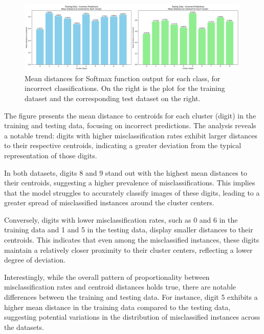 \begin{figure}[h]
    \centering
    \includegraphics[width=0.99\textwidth]{Figures/Methods/MNIST_Incorrect_Training_and_Testing_Mean_Distance_To_Centroids.png}
    \caption{Mean distances for Softmax function output for each class, for incorrect classifications. On the right is the plot for the training dataset and the corresponding test dataset on the right.}
    \label{fig:MNIST_Incorrect_Training_and_Testing_Mean_Distance_To_Centroids}
\end{figure}


The figure presents the mean distance to centroids for each cluster (digit) in the training and testing data, focusing on incorrect predictions. The analysis reveals a notable trend: digits with higher misclassification rates exhibit larger distances to their respective centroids, indicating a greater deviation from the typical representation of those digits.

In both datasets, digits 8 and 9 stand out with the highest mean distances to their centroids, suggesting a higher prevalence of misclassifications. This implies that the model struggles to accurately classify images of these digits, leading to a greater spread of misclassified instances around the cluster centers.

Conversely, digits with lower misclassification rates, such as 0 and 6 in the training data and 1 and 5 in the testing data, display smaller distances to their centroids. This indicates that even among the misclassified instances, these digits maintain a relatively closer proximity to their cluster centers, reflecting a lower degree of deviation.

Interestingly, while the overall pattern of proportionality between misclassification rates and centroid distances holds true, there are notable differences between the training and testing data. For instance, digit 5 exhibits a higher mean distance in the training data compared to the testing data, suggesting potential variations in the distribution of misclassified instances across the datasets.

